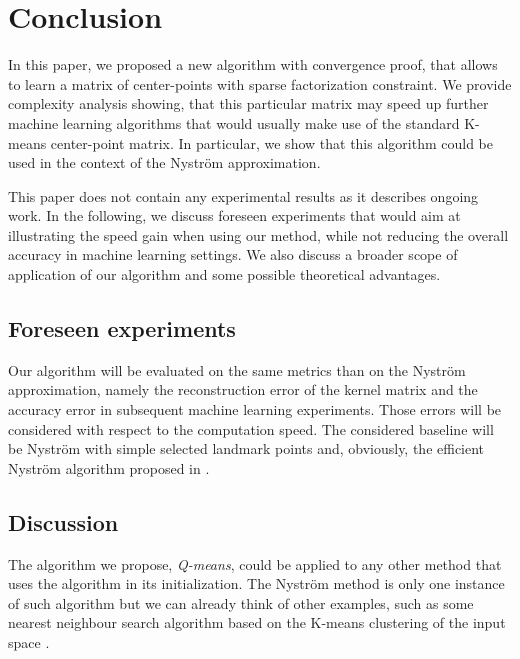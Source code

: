 \section{Conclusion}
\label{sec:conclusion}

In this paper, we proposed a new algorithm with convergence proof, that allows to learn a matrix of \kmeans center-points with sparse factorization constraint. We provide complexity analysis showing, that this particular matrix may speed up further machine learning algorithms that would usually make use of the standard K-means center-point matrix. In particular, we show that this algorithm could be used in the context of the Nyström approximation.

This paper does not contain any experimental results as it describes ongoing work. In the following, %
we discuss foreseen experiments that would aim at illustrating the speed gain when using our method, while not reducing the overall accuracy in machine learning settings.
%
We also discuss a broader scope of application of our algorithm and some possible theoretical advantages.

\subsection{Foreseen experiments}
\label{sec:foreseen_experiments}

Our algorithm will be evaluated on the same metrics than \cite{si2016computationally} on the Nyström approximation, namely the reconstruction error of the kernel matrix and the accuracy error in subsequent machine learning experiments. Those errors will be considered with respect to the computation speed. The considered baseline will be Nyström with simple \kmeans selected landmark points and, obviously, the efficient Nyström algorithm proposed in \cite{si2016computationally}.

\subsection{Discussion}
\label{sec:discussion}

The algorithm we propose, \textit{Q-means}, could be applied to any other method that uses the \kmeans algorithm in its initialization. The \kmeans Nyström method is only one instance of such algorithm but we can already think of other examples, such as some nearest neighbour search algorithm based on the K-means clustering of the input space \cite{wang2011fast}.

